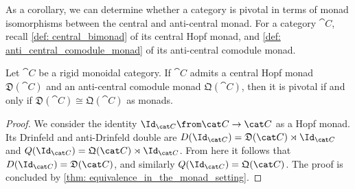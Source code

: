 As a corollary, we can determine whether a category is pivotal
in terms of monad isomorphisms between the central and anti\hyp{}central monad.
For a category \(\cat{C}\),
recall \cref{def: central_bimonad} of its central Hopf monad,
and \cref{def: anti_central_comodule_monad} of its anti\hyp{}central comodule monad.

\begin{corollary}\label{cor: pivotal_from_central_anti_central}
  Let \(\cat{C}\) be a rigid monoidal category.
  If \(\cat{C}\) admits a central Hopf monad \(\mathfrak{D}(\cat{C})\)
  and an anti\hyp{}central comodule monad \(\mathfrak{Q}(\cat{C})\),
  then it is pivotal if and only if \(\mathfrak{D}(\cat{C}) \cong \mathfrak{Q}(\cat{C})\) as monads.
\end{corollary}
\begin{proof}
  We consider the identity \(\Id_{\cat C} \from \cat C \to \cat C\) as a Hopf monad.
  Its Drinfeld and anti\hyp{}Drinfeld double are
  \(D(\Id_{\cat C}) = \mathfrak D(\cat C) \rtimes \Id_{\cat C}\)
  and \(Q(\Id_{\cat C}) = \mathfrak Q(\cat C) \rtimes \Id_{\cat C}\).
  From here it follows that \(D(\Id_{\cat C}) = \mathfrak D(\cat C)\),
  and similarly \(Q(\Id_{\cat C}) = \mathfrak Q(\cat C)\).
  The proof is concluded by \cref{thm: equivalence_in_the_monad_setting}.
\end{proof}

